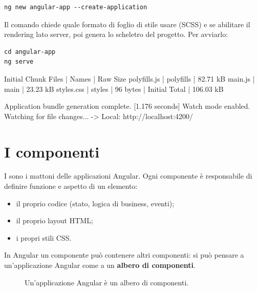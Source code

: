 \begin{lstlisting}[style=shell]
ng new angular-app --create-application
\end{lstlisting}

Il comando chiede quale formato di foglio di stile usare (SCSS) e se abilitare
il rendering lato server, poi genera lo scheletro del progetto. Per avviarlo:

\begin{lstlisting}[style=shell]
cd angular-app
ng serve
\end{lstlisting}

\begin{console}[Terminale]
Initial Chunk Files | Names     |  Raw Size
polyfills.js        | polyfills |  82.71 kB
main.js             | main      |  23.23 kB
styles.css          | styles    |     96 bytes
                    | Initial Total | 106.03 kB

Application bundle generation complete. [1.176 seconds]
Watch mode enabled. Watching for file changes...
  ->  Local:   http://localhost:4200/
\end{console}

\section{I componenti}

I  sono i mattoni delle applicazioni Angular. Ogni componente
è responsabile di definire funzione e aspetto di un elemento:

\begin{itemize}
  \item il proprio codice (stato, logica di business, eventi);
  \item il proprio layout HTML;
  \item i propri stili CSS.
\end{itemize}

In Angular un componente può contenere altri componenti: si può pensare a
un'applicazione Angular come a un \textbf{albero di componenti}.

\begin{figure}[H]
  \centering
  \caption{Un'applicazione Angular è un albero di componenti.}
  \label{fig:angular-tree}
\end{figure}

